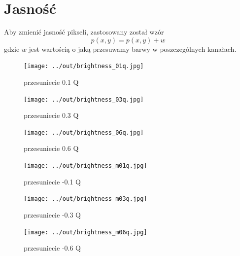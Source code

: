 \documentclass[a4paper,12pt]{article}
\begin{document}
\newpage
\section{Jasność}
Aby zmienić jasność pikseli, zastosowany został wzór
$$p(x, y) = p(x, y) + w$$
gdzie $w$ jest wartością o jaką przesuwamy barwy w poszczególnych kanałach.



\begin{figure}[h!]
\begin{minipage}[t]{5cm}
\begin{center}
\texttt{[image: ../out/brightness\_01q.jpg]}
\caption{przesuniecie 0.1 Q}
\end{center}
\end{minipage}
\hfill
\begin{minipage}[t]{5cm}
\begin{center}
\texttt{[image: ../out/brightness\_03q.jpg]}
\caption{przesuniecie 0.3 Q}
\end{center}
\end{minipage}
\hfill
\begin{minipage}[t]{5cm}
\begin{center}
\texttt{[image: ../out/brightness\_06q.jpg]}
\caption{przesuniecie 0.6 Q}
\end{center}
\end{minipage}
\end{figure}

\begin{figure}[h!]
\begin{minipage}[t]{5cm}
\begin{center}
\texttt{[image: ../out/brightness\_m01q.jpg]}
\caption{przesuniecie -0.1 Q}
\end{center}
\end{minipage}
\hfill
\begin{minipage}[t]{5cm}
\begin{center}
\texttt{[image: ../out/brightness\_m03q.jpg]}
\caption{przesuniecie -0.3 Q}
\end{center}
\end{minipage}
\hfill
\begin{minipage}[t]{5cm}
\begin{center}
\texttt{[image: ../out/brightness\_m06q.jpg]}
\caption{przesuniecie -0.6 Q}
\end{center}
\end{minipage}
\end{figure}
\end{document}
